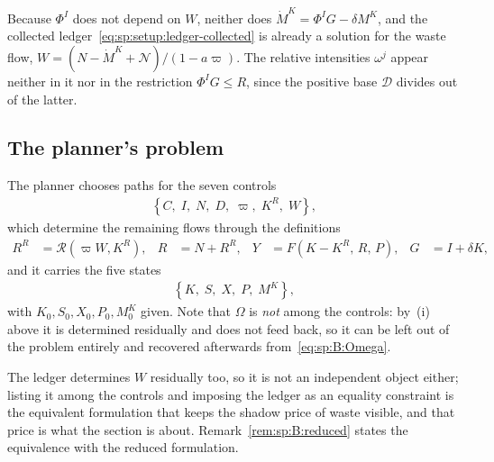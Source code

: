  Because $\Phi^I$ does not depend on $W$, neither does
$\dot M^K=\Phi^IG-\delta M^K$, and the collected ledger~\eqref{eq:sp:setup:ledger-collected} is already
a solution for the waste flow, $W=\left(N-\dot M^K+\mathcal N\right)/\left(1-a\varpi\right)$. The
relative intensities $\omega^j$ appear neither in it nor in the restriction $\Phi^IG\le R$, since the
positive base $\mathcal D$ divides out of the latter.


\subsection{The planner's problem}\label{sec:sp:B:problem}

 The planner chooses paths for the seven controls
\begin{align}
\left\{C,\;I,\;N,\;D,\;\varpi,\;K^R,\;W\right\},
\label{eq:sp:B:controls}
\end{align}
which determine the remaining flows through the definitions
\begin{align}
R^R &= \mathcal R\left(\varpi W,K^R\right),
&
R &= N+R^R,
&
Y &= F\left(K-K^R,\,R,\,P\right),
&
G &= I+\delta K,
\label{eq:sp:B:definitions}
\end{align}
and it carries the five states
\begin{align}
\left\{K,\;S,\;X,\;P,\;M^K\right\},
\label{eq:sp:B:states}
\end{align}
with $K_0,S_0,X_0,P_0,M^K_0$ given. Note that $\Omega$ is \emph{not} among the controls: by~(i) above
it is determined residually and does not feed back, so it can be left out of the problem entirely and
recovered afterwards from~\eqref{eq:sp:B:Omega}.

 The ledger determines $W$ residually too, so it is not an
independent object either; listing it among the controls and imposing the ledger as an equality
constraint is the equivalent formulation that keeps the shadow price of waste visible, and that price
is what the section is about. Remark~\ref{rem:sp:B:reduced} states the equivalence with the reduced
formulation.


